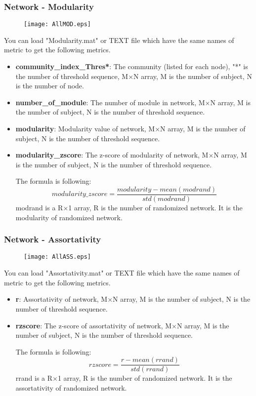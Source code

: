 \documentclass[11pt]{article}
\begin{document}
			\subsubsection{Network - Modularity}
				\begin{figure}
					\begin{center}
						\texttt{[image: AllMOD.eps]}
					\end{center}
				\end{figure}
				You can load "Modularity.mat" or TEXT file which have the same names of metric to get the following metrics.
				\begin{itemize}
					\item \textbf{community\_index\_Thres*}: The community (listed for each node), "*" is the number of threshold sequence,
						M$\times$N array, M is the number of subject, N is the number of node.
					\item \textbf{number\_of\_module}: The number of module in network,
						M$\times$N array, M is the number of subject, N is the number of threshold sequence.
					\item \textbf{modularity}: Modularity value of network,
						M$\times$N array, M is the number of subject, N is the number of threshold sequence.
					\item \textbf{modularity\_zscore}: The z-score of modularity of network,
						M$\times$N array, M is the number of subject, N is the number of threshold sequence.

						The formula is following:
						$$modularity\_zscore=\frac{modularity-mean(modrand)}{std(modrand)}$$
						modrand is a R$\times$1 array, R is the number of randomized network. 
						It is the modularity of randomized network.
				\end{itemize}
			\subsubsection{Network - Assortativity}
				\begin{figure}
					\begin{center}
						\texttt{[image: AllASS.eps]}
					\end{center}
				\end{figure}
				You can load "Assortativity.mat" or TEXT file which have the same names of metric to get the following metrics.
				\begin{itemize}
					\item \textbf{r}: Assortativity of network,
						M$\times$N array, M is the number of subject, N is the number of threshold sequence.
					\item \textbf{rzscore}: The z-score of assortativity of network,
						M$\times$N array, M is the number of subject, N is the number of threshold sequence.

						The formula is following:
						$$rzscore=\frac{r-mean(rrand)}{std(rrand)}$$
						rrand is a R$\times$1 array, R is the number of randomized network. 
						It is the assortativity of randomized network.
				\end{itemize}
\end{document}
